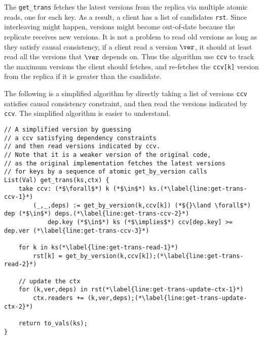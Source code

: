 The \verb|get_trans| fetches the latest versions from the replica via multiple atomic reads, one for each key.
As a result, a client has a list of candidates \verb|rst|.
Since interleaving might happen, versions might become out-of-date because the replicate receives new versions.
It is not a problem to read old versions as long as they satisfy causal consistency,
\ie if a client read a version \( \ver \), it should at least read all the versions that \( \ver \) depends on.
Thus the algorithm use \verb|ccv| to track the maximum versions the client should fetches,
and re-fetches the \verb|ccv[k]| version from the replica if it is greater than the candidate.

The following is a simplified algorithm by directly taking a list of versions \verb|ccv| satisfies causal consistency constraint,
and then read the versions indicated by \verb|ccv|.
The simplified algorithm is easier to understand.
\begin{lstlisting}[caption={get\_trans},label={lst:get-trans}]
// A simplified version by guessing
// a ccv satisfying dependency constraints
// and then read versions indicated by ccv.
// Note that it is a weaker version of the original code,
// as the original implementation fetches the latest versions
// for keys by a sequence of atomic get_by_version calls
List(Val) get_trans(ks,ctx) {
    take ccv: (*$\forall$*) k (*$\in$*) ks.(*\label{line:get-trans-ccv-1}*)
        (_,_,deps) := get_by_version(k,ccv[k]) (*${}\land \forall$*) dep (*$\in$*) deps.(*\label{line:get-trans-ccv-2}*)
            dep.key (*$\in$*) ks (*$\implies$*) ccv[dep.key] >= dep.ver (*\label{line:get-trans-ccv-3}*)

    for k in ks(*\label{line:get-trans-read-1}*)
        rst[k] = get_by_version(k,ccv[k]);(*\label{line:get-trans-read-2}*)

    // update the ctx
    for (k,ver,deps) in rst(*\label{line:get-trans-update-ctx-1}*)
        ctx.readers += (k,ver,deps);(*\label{line:get-trans-update-ctx-2}*)

    return to_vals(ks);
}                                   
\end{lstlisting}
